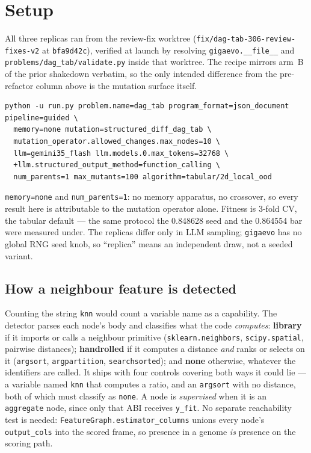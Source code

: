 \documentclass[11pt]{article}
\begin{document}
\section{Setup}

All three replicas ran from the review-fix worktree
(\texttt{fix/dag-tab-306-review-fixes-v2} at \texttt{bfa9d42c}), verified at launch by
resolving \texttt{gigaevo.\_\_file\_\_} and \texttt{problems/dag\_tab/validate.py} inside
that worktree. The recipe mirrors arm~B of the prior shakedown verbatim, so the only
intended difference from the pre-refactor column above is the mutation surface itself.

\begin{lstlisting}
python -u run.py problem.name=dag_tab program_format=json_document pipeline=guided \
  memory=none mutation=structured_diff_dag_tab \
  mutation_operator.allowed_changes.max_nodes=10 \
  llm=gemini35_flash llm.models.0.max_tokens=32768 \
  +llm.structured_output_method=function_calling \
  num_parents=1 max_mutants=100 algorithm=tabular/2d_local_ood
\end{lstlisting}

\noindent
\texttt{memory=none} and \texttt{num\_parents=1}: no memory apparatus, no crossover, so
every result here is attributable to the mutation operator alone. Fitness is 3-fold CV,
the tabular default --- the same protocol the 0.848628 seed and the 0.864554 bar were
measured under. The replicas differ only in LLM sampling; \texttt{gigaevo} has no global
RNG seed knob, so ``replica'' means an independent draw, not a seeded variant.

\subsection{How a neighbour feature is detected}
\label{sec:detector}

Counting the string \texttt{knn} would count a variable name as a capability. The detector
parses each node's body and classifies what the code \emph{computes}: \textbf{library} if it
imports or calls a neighbour primitive (\texttt{sklearn.neighbors}, \texttt{scipy.spatial},
pairwise distances); \textbf{handrolled} if it computes a distance \emph{and} ranks or
selects on it (\texttt{argsort}, \texttt{argpartition}, \texttt{searchsorted}); and
\textbf{none} otherwise, whatever the identifiers are called. It ships with four controls
covering both ways it could lie --- a variable named \texttt{knn} that computes a ratio, and
an \texttt{argsort} with no distance, both of which must classify as \texttt{none}. A node is
\emph{supervised} when it is an \texttt{aggregate} node, since only that ABI receives
\texttt{y\_fit}. No separate reachability test is needed: \texttt{FeatureGraph.estimator\_columns}
unions every node's \texttt{output\_cols} into the scored frame, so presence in a genome
\emph{is} presence on the scoring path.
\end{document}
